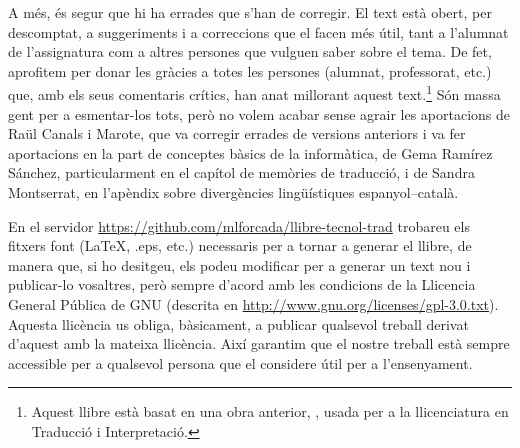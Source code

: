   A més, és segur que hi ha errades que s'han de corregir. El text
  està obert, per descomptat, a suggeriments i a correccions que el
  facen més útil, tant a l'alumnat de l'assignatura com a altres
  persones que vulguen saber sobre el tema.  De fet, aprofitem per
  donar les gràcies a totes les persones (alumnat, professorat, etc.)
  que, amb els seus comentaris crítics, han anat millorant aquest
  text.\footnote{Aquest llibre està basat en una obra anterior,
    \protect\citep{forcada09b}, usada per a la llicenciatura en
    Traducció i Interpretació.}  Són massa gent per a esmentar-los
  tots, però no volem acabar sense agrair les aportacions de Raül
  Canals i Marote, que va corregir errades de versions anteriors i va
  fer aportacions en la part de conceptes bàsics de la informàtica,
  de Gema Ramírez Sánchez, particularment en el capítol de memòries de
  traducció, i de Sandra Montserrat, en l'apèndix sobre divergències lingüístiques espanyol--català.

En el servidor \url{https://github.com/mlforcada/llibre-tecnol-trad}
trobareu els fitxers font (\LaTeX, .eps, etc.) necessaris per a tornar
a generar el llibre, de manera que, si ho desitgeu, els podeu
modificar per a generar un text nou i publicar-lo vosaltres, però
sempre d'acord amb les condicions de la Llicencia General Pública de
GNU (descrita en
\url{http://www.gnu.org/licenses/gpl-3.0.txt}). Aquesta llicència us
obliga, bàsicament, a publicar qualsevol treball derivat d'aquest amb
la mateixa llicència. Així garantim que el nostre treball està sempre
accessible per a qualsevol persona que el considere útil per a
l'ensenyament.

